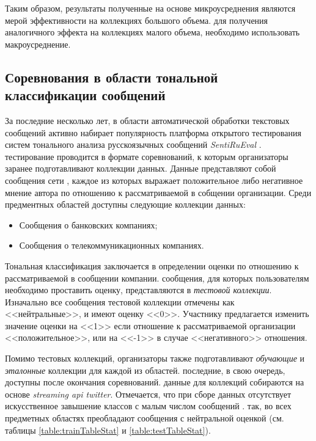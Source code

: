     Таким образом, результаты полученные на основе микроусреднения являются мерой
    эффективности на коллекциях большого объема. для получения аналогичного эффекта
    на коллекциях малого объема, необходимо использовать макроусреднение. \cite{micromacromeasuresdifferences}

    \subsection{Соревнования в области тональной классификации сообщений}
    \label{sec:tonalityCompetition}
    За последние несколько лет, в области автоматической обработки текстовых сообщений
    активно набирает популярность платформа открытого тестирования систем
    тонального анализа русскоязычных сообщений {\it SentiRuEval} \cite{tonalityanalisys}.
    тестирование проводится в формате соревнований, к которым организаторы заранее подготавливают
    коллекции данных. Данные представляют собой сообщения сети \twitter, каждое из которых
    выражает положительное либо негативное мнение автора по отношению к рассматриваемой
    в собщении организации. Среди предментных областей доступны следующие коллекции
    данных:
    \begin{itemize}
        \item Сообщения о банковских компаниях;
        \item Сообщения о телекоммуникационных компаниях.
    \end{itemize}

    Тональная классификация заключается в определении оценки по отношению к
    рассматриваемой в сообщении компании. сообщения, для которых пользователям
    необходимо проставить оценку, представляются в {\it тестовой коллекции}. Изначально все
    сообщения тестовой коллекции отмечены как <<нейтральные>>, и имеют оценку <<0>>.
    Участнику предлагается изменить значение оценки на <<1>> если отношение к
    рассматриваемой организации <<положительное>>, или на <<-1>> в случае
    <<негативного>> отношения.


    Помимо тестовых коллекций, организаторы также подготавливают {\it обучающие} и
    {\it эталонные} коллекции для каждой из областей. последние, в свою очередь,
    доступны после окончания соревнований. данные для коллекций собираются на
    основе {\it streaming api twitter}. Отмечается, что при сборе данных отсутствует
    искусственное завышение классов с малым числом сообщений \cite{tonalityanalisys}.
    так, во всех предметных областях преобладают сообщения с нейтральной оценкой (см. таблицы
    \ref{table:trainTableStat} и \ref{table:testTableStat}).

